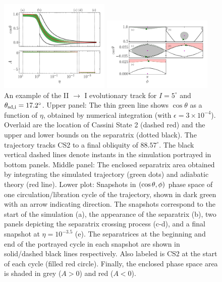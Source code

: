 \begin{figure}
    \centering
    \includegraphics[width=0.47\textwidth]{plots_diskdisp/3testo21.png}

    \includegraphics[width=0.47\textwidth]{plots_diskdisp/3testo21_subplots.png}
    \caption{An example of the II $\to$ I evolutionary track for $I = 5^\circ$
    and $\theta_{\rm sd, i} = 17.2^\circ$. Upper panel: The thin green line shows
    $\cos \theta$ as a function of $\eta$, obtained by numerical integration
    (with $\epsilon = 3 \times 10^{-4}$). Overlaid are the location of Cassini
    State 2 (dashed red) and the upper and lower bounds on the separatrix
    (dotted black). The trajectory tracks CS2 to a final obliquity of
    $88.57^\circ$. The black vertical dashed lines denote instants in the
    simulation  portrayed in bottom panels. Middle panel: The enclosed
    separatrix area obtained by integrating the simulated trajectory (green
    dots) and adiabatic theory (red line). Lower plot: Snapshots in $\left(\cos
    \theta, \phi\right)$ phase space of one circulation/libration cycle of the
    trajectory, shown in dark green with an arrow indicating direction. The
    snapshots correspond to the start of the simulation (a), the appearance of
    the separatrix (b), two panels depicting the separatrix crossing process
    (c-d), and a final snapshot at $\eta = 10^{-3.5}$ (e). The separatrices at
    the beginning and end of the portrayed cycle in each snapshot are shown in
    solid/dashed black lines respectively. Also labeled is CS2 at the start of
    each cycle (filled red circle). Finally, the enclosed phase space area is
    shaded in grey ($A > 0$) and red ($A < 0$).}\label{fig:ad_21}
\end{figure}
